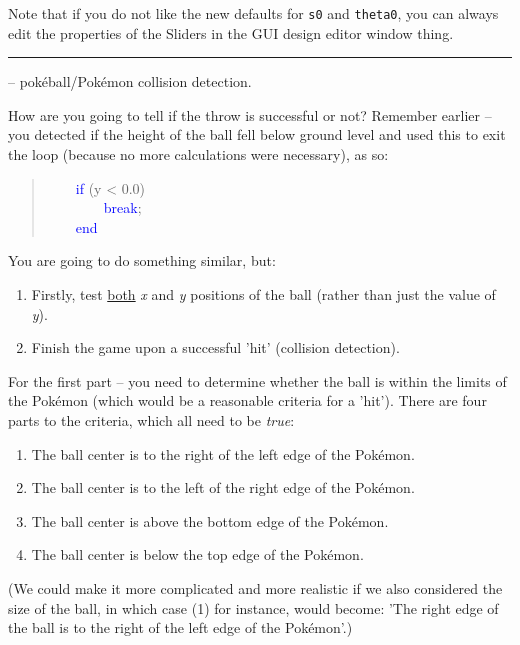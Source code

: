 \documentclass{tufte-book} %
\newenvironment{docspec}{\begin{quotation}\ttfamily\parskip0pt\parindent0pt\ignorespaces}{\end{quotation}}
\begin{document}
Note that if you do not like the new defaults for  \texttt{s0} and \texttt{theta0}, you can always edit the properties of the \textsf{Sliders} in the GUI design editor window thing.

\vspace{1mm}
\noindent\rule{4cm}{0.5pt}
\vspace{-2mm}

 -- pok\'eball/Pok\'emon collision detection.

How are you going to tell if the throw is successful or not? Remember earlier -- you detected if the height of the ball fell below ground level and used this to exit the loop (because no more calculations were necessary), as so:
\begin{docspec}
\ \ \ \    \textcolor{blue}{if} (y < 0.0)\\
\ \ \ \ \ \ \ \        \textcolor{blue}{break};\\
\ \ \ \    \textcolor{blue}{end}
\end{docspec}
You are going to do something similar, but:
\begin{enumerate}[noitemsep]
\setlength{\itemindent}{.2in}
\item Firstly, test \uline{both} \textit{x} and \textit{y} positions of the ball (rather than just the value of \textit{y}).
\item Finish the game upon a successful 'hit' (collision detection).
\end{enumerate}

For the first part -- you need to determine whether the ball is within the limits of the Pok\'emon (which would be a reasonable criteria for a 'hit'). There are four parts to the criteria, which all need to be \textit{true}:
\vspace{-2mm}\begin{enumerate}[noitemsep]
\setlength{\itemindent}{.2in}
\item The ball center is to the right of the left edge of the Pok\'emon.
\item The ball center is to the left of the right edge of the Pok\'emon.
\item The ball center is above the bottom edge of the Pok\'emon.
\item The ball center is below the top edge of the Pok\'emon.
\end{enumerate}\vspace{-2mm}
(We could make it more complicated and more realistic if we also considered the size of the ball, in which case (1) for instance, would become: 'The right edge of the ball  is to the right of the left edge of the Pok\'emon'.)
\end{document}
